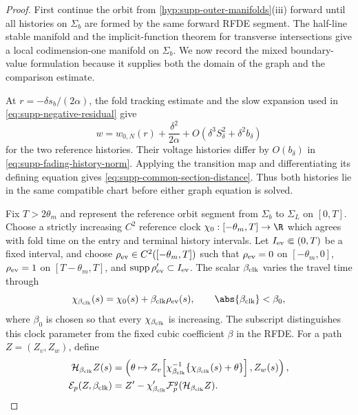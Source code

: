\begin{proof}
First continue the orbit from
\cref{hyp:supp-outer-manifolds}(iii) forward until all histories on
\(\Sigma_b\) are formed by the same forward RFDE segment.  The half-line
stable manifold and the implicit-function theorem for transverse
intersections give a local
codimension-one manifold on \(\Sigma_b\).  We now record the mixed
boundary-value formulation because it supplies both the domain of the
graph and the comparison estimate.

At \(r=-\delta s_b/(2\alpha)\), the fold tracking estimate and the slow
expansion used in \cref{eq:supp-negative-residual} give
\[
 w=w_{0,N}(r)+\frac{\delta^2}{2\alpha}
     +O(\delta^3S_\delta^2+\delta^2b_\delta)
\]
for the two reference histories.  Their voltage histories differ by
\(O(b_\delta)\) in \cref{eq:supp-fading-history-norm}.  Applying the
transition map and differentiating its defining equation gives
\cref{eq:supp-common-section-distance}.  Thus both histories lie in the
same compatible chart before either graph equation is solved.

Fix \(T>2\theta_m\) and represent the reference orbit segment from
\(\Sigma_b\) to \(\Sigma_L\) on \([0,T]\).  Choose a strictly increasing
\(C^2\) reference clock
\(\chi_0:[-\theta_m,T]\to\R\) which agrees with fold time on the entry and
terminal history intervals.  Let \(I_{\rm ev}\Subset(0,T)\) be a fixed
interval, and choose \(\rho_{\rm ev}\in C^2([ -\theta_m,T])\) such that
\(\rho_{\rm ev}=0\) on \([ -\theta_m,0]\),
\(\rho_{\rm ev}=1\) on \([T-\theta_m,T]\), and
\(\operatorname{supp}\rho_{\rm ev}'\subset I_{\rm ev}\).  The scalar
\(\beta_{\rm clk}\) varies the
travel time through
\begin{equation}
 \chi_{\beta_{\rm clk}}(s)
 =\chi_0(s)+\beta_{\rm clk}\rho_{\rm ev}(s),
 \qquad \abs{\beta_{\rm clk}}<\beta_0,
 \label{eq:supp-clock-family}
\end{equation}
where \(\beta_0\) is chosen so that every \(\chi_{\beta_{\rm clk}}\) is
increasing.  The subscript distinguishes this clock parameter from the fixed
cubic coefficient \(\beta\) in the RFDE.
For a path \(Z=(Z_v,Z_w)\), define
\begin{align}
 \mathcal H_{\beta_{\rm clk}} Z(s)
 &=\left(\theta\mapsto
 Z_v\!\left[\chi_{\beta_{\rm clk}}^{-1}
       \{\chi_{\beta_{\rm clk}}(s)+\theta\}\right],Z_w(s)\right),\notag\\
 \mathcal E_p(Z,\beta_{\rm clk})
 &=Z'-\chi_{\beta_{\rm clk}}'\mathcal F_p^g
       (\mathcal H_{\beta_{\rm clk}} Z).
 \label{eq:supp-clocked-history-residual}
\end{align}


\end{proof}
